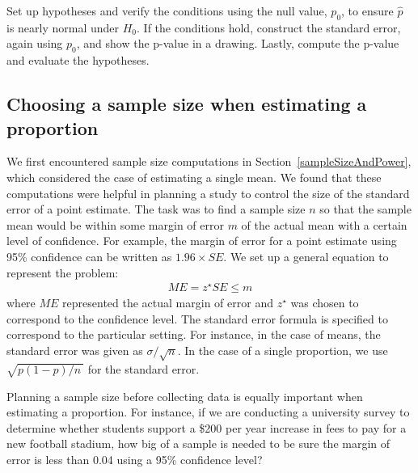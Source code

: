 \begin{termBox}{
Set up hypotheses and verify the conditions using the null value, $p_0$, to ensure $\hat{p}$ is nearly normal under $H_0$. If the conditions hold, construct the standard error, again using $p_0$, and show the p-value in a drawing. Lastly, compute the p-value and evaluate the hypotheses.}
\end{termBox}


\subsection{Choosing a sample size when estimating a proportion}


We first encountered sample size computations in Section~\ref{sampleSizeAndPower}, which considered the case of estimating a single mean. We found that these computations were helpful in planning a study to control the size of the standard error of a point estimate. The task was to find a sample size $n$ so that the sample mean would be within some margin of error $m$ of the actual mean with a certain level of confidence. For example, the margin of error for a point estimate using 95\% confidence can be written as $1.96\times SE$. We set up a general equation to represent the problem:
\begin{align*}
ME = z^{\star}SE \leq m
\end{align*}
where $ME$ represented the actual margin of error and $z^{\star}$ was chosen to correspond to the confidence level. The standard error formula is specified to correspond to the particular setting. For instance, in the case of means, the standard error was given as $\sigma / \sqrt{n}$. In the case of a single proportion, we use $\sqrt{p(1-p) / n\ }$ for the standard error.

Planning a sample size before collecting data is equally important when estimating a proportion. For instance, if we are conducting a university survey to determine whether students support a \$200 per year increase in fees to pay for a new football stadium, how big of a sample is needed to be sure the margin of error is less than 0.04 using a 95\% confidence level?

